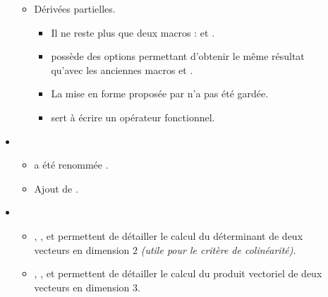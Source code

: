 \documentclass[12pt,a4paper]{book}
\begin{document}
\begin{description}
\begin{itemize}[itemsep=.5em]
\begin{itemize}[itemsep=.5em]
    
            \item Dérivées partielles.
            
            \begin{itemize}[itemsep=.5em, label=$\rightarrow$]
                \item Il ne reste plus que deux macros :  et .
    
                \item {} possède des options permettant d'obtenir le même résultat qu'avec les anciennes macros  et .
    
                \item La mise en forme proposée par  n'a pas été gardée.
    
                \item {} sert à écrire un opérateur fonctionnel.
    	    \end{itemize}
        \end{itemize}
    
    
    
    
        \separation
        \item {}
        \begin{itemize}[itemsep=.5em]
            \item {} a été renommée .
    
            \item Ajout de .
        \end{itemize}
    
    
    
    
        \separation
        \item {}
        \begin{itemize}[itemsep=.5em]
            \item {}, ,  et  permettent de détailler le calcul du déterminant de deux vecteurs en dimension $2$ \emph{(utile pour le critère de colinéarité)}.
    
    
            \item {}, ,  et  permettent de détailler le calcul du produit vectoriel de deux vecteurs en dimension $3$.
    

\end{itemize}
\end{itemize}
\end{description}
\end{document}

